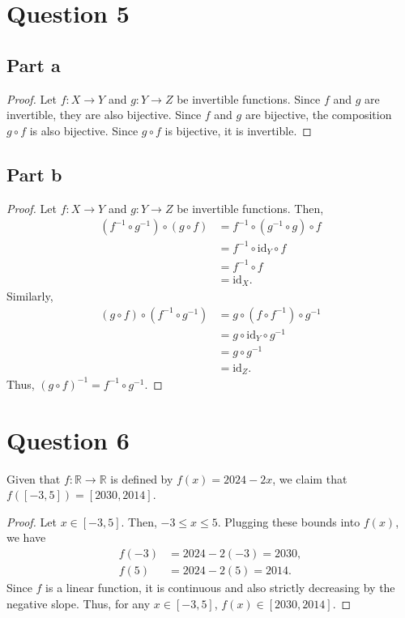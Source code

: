 \documentclass{article}
\begin{document}
\section*{Question 5}

\subsection*{Part a}
\begin{proof}
    Let $f: X \to Y$ and $g: Y \to Z$ be invertible functions.
    Since $f$ and $g$ are invertible, they are also bijective.
    Since $f$ and $g$ are bijective, the composition $g \circ f$ is also bijective.
    Since $g \circ f$ is bijective, it is invertible.
\end{proof}

\subsection*{Part b}
\begin{proof}
    Let $f: X \to Y$ and $g: Y \to Z$ be invertible functions.
    Then,
    \begin{align*}
        (f^{-1} \circ g^{-1}) \circ (g \circ f) &= f^{-1} \circ (g^{-1} \circ g) \circ f \\
        &= f^{-1} \circ \text{id}_Y \circ f \\
        &= f^{-1} \circ f \\
        &= \text{id}_X.
    \end{align*}
    Similarly,
    \begin{align*}
        (g \circ f) \circ (f^{-1} \circ g^{-1}) &= g \circ (f \circ f^{-1}) \circ g^{-1} \\
        &= g \circ \text{id}_Y \circ g^{-1} \\
        &= g \circ g^{-1} \\
        &= \text{id}_Z.
    \end{align*}
    Thus, $(g \circ f)^{-1} = f^{-1} \circ g^{-1}$.
\end{proof}

\section*{Question 6}
Given that $f: \mathbb{R} \to \mathbb{R}$ is defined by $f(x) = 2024 - 2x$, we claim that $f([-3, 5]) = [2030, 2014]$.

\begin{proof}
Let $x \in [-3, 5]$.
Then, $-3 \leq x \leq 5$.
Plugging these bounds into $f(x)$, we have
\begin{align*}
    f(-3) &= 2024 - 2(-3) = 2030, \\
    f(5) &= 2024 - 2(5) = 2014.
\end{align*}
Since $f$ is a linear function, it is continuous and also strictly decreasing by the negative slope.
Thus, for any $x \in [-3, 5]$, $f(x) \in [2030, 2014]$.
\end{proof}
\end{document}
